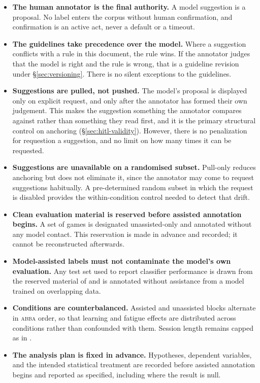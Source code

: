 \begin{itemize}
  \item {} \textbf{The human annotator is the final authority.} A model suggestion is a proposal. No label enters the corpus without human confirmation, and confirmation is an active act, never a default or a timeout.

  \item {} \textbf{The guidelines take precedence over the model.} Where a suggestion conflicts with a rule in this document, the rule wins. If the annotator judges that the model is right and the rule is wrong, that is a guideline revision under \S\ref{sec:versioning}. There is no silent exceptions to the guidelines. 

  \item {} \textbf{Suggestions are pulled, not pushed.} The model's proposal is displayed only on explicit request, and only after the annotator has formed their own judgement. This makes the suggestion something the annotator compares against rather than something they read first, and it is the primary structural control on anchoring (\S\ref{sec:hitl-validity}). However, there is no penalization for requestion a suggestion, and no limit on how many times it can be requested.

  \item {} \textbf{Suggestions are unavailable on a randomised subset.} Pull-only reduces anchoring but does not eliminate it, since the annotator may come to request suggestions habitually. A pre-determined random subset in which the request is disabled provides the within-condition control needed to detect that drift.

  \item {} \textbf{Clean evaluation material is reserved before assisted annotation begins.} A set of games is designated unassisted-only and annotated without any model contact. This reservation is made in advance and recorded; it cannot be reconstructed afterwards.

  \item {} \textbf{Model-assisted labels must not contaminate the model's own evaluation.} Any test set used to report classifier performance is drawn from the reserved material of  and is annotated without assistance from a model trained on overlapping data.

  \item {} \textbf{Conditions are counterbalanced.} Assisted and unassisted blocks alternate in \textsc{abba} order, so that learning and fatigue effects are distributed across conditions rather than confounded with them. Session length remains capped as in .

  \item {} \textbf{The analysis plan is fixed in advance.} Hypotheses, dependent variables, and the intended statistical treatment are recorded before assisted annotation begins and reported as specified, including where the result is null.
\end{itemize}

